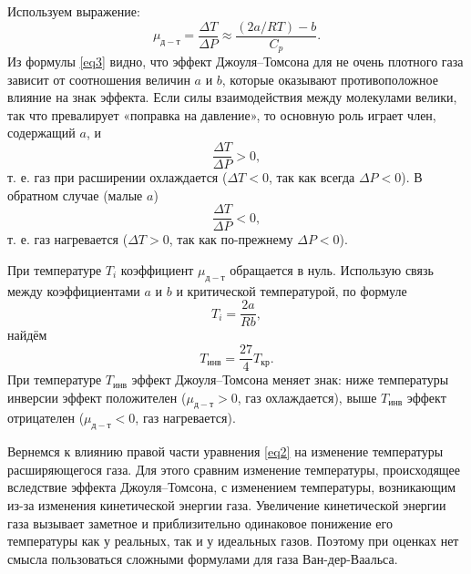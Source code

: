 \documentclass[a4paper, 12pt]{article}
\begin{document}
    Используем выражение:
    \begin{equation}
        \mu_{д-т} = \frac{\Delta T}{\Delta P} \approx \frac{(2a / RT) - b}{C_p}.
        \label{eq3}
    \end{equation}
    Из формулы \eqref{eq3} видно, что эффект Джоуля–Томсона для не очень плотного газа зависит от соотношения величин $a$ и $b$, которые оказывают противоположное влияние на знак эффекта. Если силы взаимодействия между молекулами велики, так что превалирует «поправка на давление», то основную роль играет член, содержащий $a$, и
    \begin{equation}
        \frac{\Delta T}{\Delta P} > 0,
    \end{equation}
    т. е. газ при расширении охлаждается ($\Delta T < 0$, так как всегда $\Delta P < 0$). В обратном случае (малые $a$)
    \begin{equation}
        \frac{\Delta T}{\Delta P} < 0,
    \end{equation}
    т. е. газ нагревается ($\Delta T > 0$, так как по-прежнему $\Delta P < 0$).
    
    При температуре $T_i$ коэффициент $\mu_{д-т}$ обращается в нуль. Использую связь между коэффициентами $a$ и $b$ и критической температурой, по формуле
    \begin{equation}
        T_i = \frac{2a}{R b},
    \end{equation}
    найдём
    \begin{equation}
        T_{инв} = \frac{27}{4} T_{кр}.
        \label{eq4}
    \end{equation}
    При температуре $T_{инв}$ эффект Джоуля–Томсона меняет знак: ниже температуры инверсии эффект положителен ($\mu_{д-т} > 0$, газ охлаждается), выше $T_{инв}$ эффект отрицателен ($\mu_{д-т} < 0$, газ нагревается).
    
    Вернемся к влиянию правой части уравнения \eqref{eq2} на изменение температуры расширяющегося газа. Для этого сравним изменение температуры, происходящее вследствие эффекта Джоуля–Томсона, с изменением температуры, возникающим из-за изменения кинетической энергии газа. Увеличение кинетической энергии газа вызывает заметное и приблизительно одинаковое понижение его температуры как у реальных, так и у идеальных газов. Поэтому при оценках нет смысла пользоваться сложными формулами для газа Ван-дер-Ваальса.
    
\end{document}
